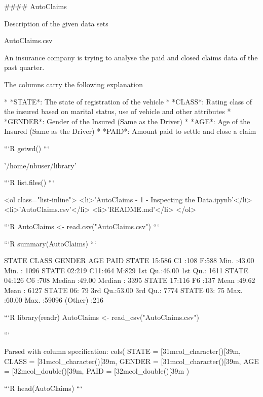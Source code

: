 \documentclass[a4paper,12pt]{article}
\begin{document}
#### AutoClaims

Description of the given data sets

AutoClaims.csv

An insurance company is trying to analyse the paid and closed claims data of the past quarter.

The columns carry the following explanation

* *STATE*: The state of registration of the vehicle
* *CLASS*: Rating class of the insured based on marital status, use of vehicle and other attributes
* *GENDER*: Gender of the Insured (Same as the Driver)
* *AGE*: Age of the Insured (Same as the Driver)
* *PAID*: Amount paid to settle and close a claim



```R
getwd()
```


'/home/nbuser/library'



```R
list.files()
```


<ol class="list-inline">
	<li>'AutoClaims - 1 - Inspecting the Data.ipynb'</li>
	<li>'AutoClaims.csv'</li>
	<li>'README.md'</li>
</ol>




```R
AutoClaims <- read.csv("AutoClaims.csv")
```


```R
summary(AutoClaims)
```


          STATE     CLASS     GENDER       AGE             PAID      
     STATE 15:586   C1 :108   F:588   Min.   :43.00   Min.   : 1096  
     STATE 02:219   C11:464   M:829   1st Qu.:46.00   1st Qu.: 1611  
     STATE 04:126   C6 :708           Median :49.00   Median : 3395  
     STATE 17:116   F6 :137           Mean   :49.62   Mean   : 6127  
     STATE 06: 79                     3rd Qu.:53.00   3rd Qu.: 7774  
     STATE 03: 75                     Max.   :60.00   Max.   :59096  
     (Other) :216                                                    



```R
library(readr)
AutoClaims <- read_csv("AutoClaims.csv")

```

    Parsed with column specification:
    cols(
      STATE = [31mcol_character()[39m,
      CLASS = [31mcol_character()[39m,
      GENDER = [31mcol_character()[39m,
      AGE = [32mcol_double()[39m,
      PAID = [32mcol_double()[39m
    )



```R
head(AutoClaims)
```
\end{document}
